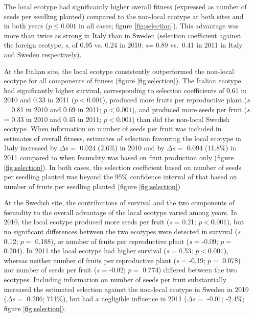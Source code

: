 \documentclass[12pt,]{article}
\begin{document}
The local ecotype had significantly higher overall fitness (expressed as number of seeds per seedling planted) compared to the non-local ecotype at both sites and in both years (\(p \leq 0.001\) in all cases; figure \ref{fig:selection}).
This advantage was more than twice as strong in Italy than in Sweden
(selection coefficient against the foreign ecotype, \emph{s}, of
0.95
vs.
0.24
in 2010;
\emph{s}=
0.89
vs.~0.41
in 2011 in Italy and Sweden respectively).

At the Italian site, the local ecotype consistently outperformed the non-local ecotype for all components of fitness (figure \ref{fig:selection}).
The Italian ecotype had significantly higher survival, corresponding to selection coefficients of
0.61 in 2010 and
0.33 in 2011
(\(p < 0.001\)),
produced more fruits per reproductive plant
(\emph{s} =
0.81 in 2010 and
0.69 in 2011;
\(p < 0.001\)),
and produced more seeds per fruit
(\emph{s} =
0.33 in 2010 and
0.45 in 2011;
\(p < 0.001\))
than did the non-local Swedish ecotype.
When information on number of seeds per fruit was included in estimates of overall fitness, estimates of selection favouring the local ecotype in Italy increased by
\(\Delta s=\)
0.024
(2.6\%)
in 2010 and by \(\Delta s=\)
0.094
(11.8\%)
in 2011 compared to when fecundity was based on fruit production only (figure \ref{fig:selection}).
In both cases, the selection coefficient based on number of seeds per seedling planted was beyond the 95\% confidence interval of that based on number of fruits per seedling planted (figure \ref{fig:selection})

At the Swedish site, the contributions of survival and the two components of fecundity to the overall advantage of the local ecotype varied among years.
In 2010, the local ecotype produced more seeds per fruit
(\emph{s} = 0.21;
\(p < 0.001\)),
but no significant differences between the two ecotypes were detected in survival
(\emph{s} = 0.12;
\(p=\) 0.188),
or number of fruits per reproductive plant
(\emph{s} = -0.09;
\(p=\) 0.204).
In 2011 the local ecotype had higher survival
(\emph{s} = 0.53;
\(p < 0.001\)),
whereas neither number of fruits per reproductive plant
(\emph{s} = -0.19;
\(p=\) 0.078)
nor number of seeds per fruit
(\emph{s} = -0.02;
\(p=\) 0.774)
differed between the two ecotypes.
Including information on number of seeds per fruit substantially increased the estimated selection against the non-local ecotype in Sweden in 2010
(\(\Delta s=\)
0.206;
711\%),
but had a negligible influence in 2011
(\(\Delta s=\)
-0.01;
-2.4\%;
figure \ref{fig:selection}).
\end{document}
